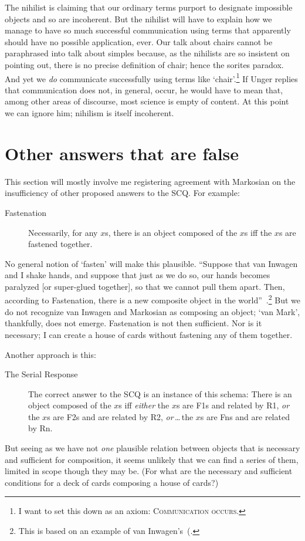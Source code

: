 \documentclass[11pt]{article}
\begin{document}
\begin{spacing}{1.5}
The nihilist is claiming that our ordinary terms purport to designate impossible objects and so are incoherent. But the nihilist will have to explain how we manage to have so much successful communication using terms that apparently should have no possible application, ever. Our talk about chairs cannot be paraphrased into talk about simples because, as the nihilists are so insistent on pointing out, there is no precise definition of chair; hence the sorites paradox. And yet we {\em do} communicate successfully using terms like `chair'.\footnote{I want to set this down as an axiom: \textsc{Communication occurs.}} If Unger replies that communication does not, in general, occur, he would have to mean that, among other areas of discourse, most science is empty of content. At this point we can ignore him; nihilism is itself incoherent.

\section{Other answers that are false}
This section will mostly involve me registering agreement with Markosian on the insufficiency of other proposed answers to the SCQ. For example:
\begin{description}
	\item[Fastenation] Necessarily, for any $x$s, there is an object composed of the $x$s iff the $x$s are fastened together.~\citep[223]{markosian1998a}
\end{description}
No general notion of `fasten' will make this plausible. ``Suppose that van Inwagen and I shake hands, and suppose that just as we do so, our hands becomes paralyzed [or super-glued together], so that we cannot pull them apart. Then, according to Fastenation, there is a new composite object in the world''~\citep[224]{markosian1998a}.\footnote{This is based on an example of van Inwagen's~(\citeyear[57--58]{inwagen1995}.} But we do not recognize van Inwagen and Markosian as composing an object; `van Mark', thankfully, does not emerge. Fastenation is not then sufficient. Nor is it necessary; I can create a house of cards without fastening any of them together.

Another approach is this:
\begin{description}
	\item[The Serial Response] The correct answer to the SCQ is an instance of this schema: There is an object composed of the $x$s iff {\em either} the $x$s are F1s and related by R1, {\em or} the $x$s are F2s and are related by R2, {\em or}\,\ldots\,the $x$s are Fns and are related by Rn.~\citep[230]{markosian1998a}
\end{description}
But seeing as we have not {\em one} plausible relation between objects that is necessary and sufficient for composition, it seems unlikely that we can find a series of them, limited in scope though they may be. (For what are the necessary and sufficient conditions for a deck of cards composing a house of cards?)


\end{spacing}
\end{document}
